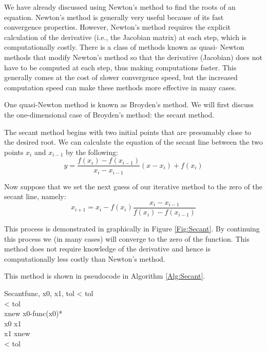 

We have already discussed using Newton's method to find the roots of an
equation. Newton's method is generally very useful because of its fast
convergence properties. However, Newton's method requires the explicit
calculation of the derivative (i.e., the Jacobian matrix) at each step,
which is computationally costly. There is a class of methods known as quasi-
Newton methods that modify Newton's method so that the derivative (Jacobian)
does not have to be computed at each step, thus making computations faster.
This generally comes at the cost of slower convergence speed, but the increased
computation speed can make these methods more effective in many cases.

One quasi-Newton method is known as Broyden's method. We will first discuss the
one-dimensional case of Broyden's method: the secant method.

The secant method begins with two initial points that are presumably close to
the desired root. We can calculate the equation of the secant line between the
two points $x_i$ and $x_{i-1}$ by the following: \[ y = \frac{f(x_i)-f(x_{i-1
})}{x_i-x_{i-1}}(x-x_i) + f(x_i) \]

Now suppose that we set the next guess of our iterative method to the zero of
the secant line, namely: \[ x_{i+1} = x_i - f(x_i)\frac{x_i-
x_{i-1}}{f(x_i)-f(x_{i-1})} \]

This process is demonstrated in graphically in Figure \ref{Fig:Secant}.  By
continuing this process we (in many cases) will converge to the zero of the
function. This method does not require knowledge of the derivative and hence is
computationally less costly than Newton's method.

This method is shown in pseudocode in Algorithm \ref{Alg:Secant}.

\begin{pseudo}{Secant}{func, x0, x1, tol}
\label{Alg:Secant}
\IF {} < tol \THEN
    \\
\IF {} < tol \THEN
    \\

\REPEAT 
xnew \GETS x0-func(x0)*\\
x0 \GETS x1 \\
x1 \GETS xnew \\
\UNTIL {} < tol \THEN {}
\end{pseudo}


